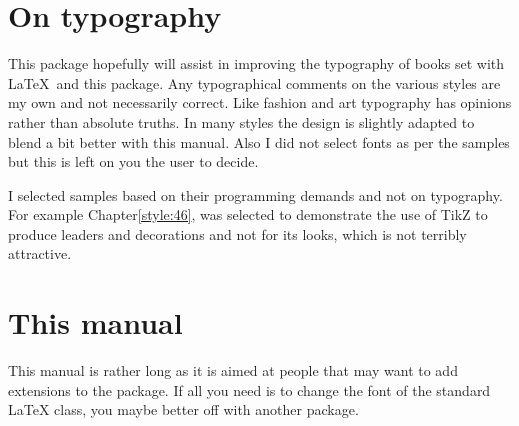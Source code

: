 \section{On typography}

This package hopefully will assist in improving the typography of books set with \LaTeX\ and this package. Any typographical comments on the various styles are my own and not necessarily correct. Like fashion and art typography has opinions rather than absolute truths. In many styles the design is slightly adapted to blend a bit better with this manual. Also I did not select fonts as per the samples but this is left on you the user to decide.

I selected samples based on their programming demands and not on  typography. For example Chapter\ref{style:46}, was selected to demonstrate the use of TikZ to produce leaders and decorations and not for its looks, which is not terribly attractive.

\section{This manual}

This manual is rather long as it is aimed at people that may want to add extensions to the package. If all you need is to change the font of the standard LaTeX class, you maybe better off with another package. 















